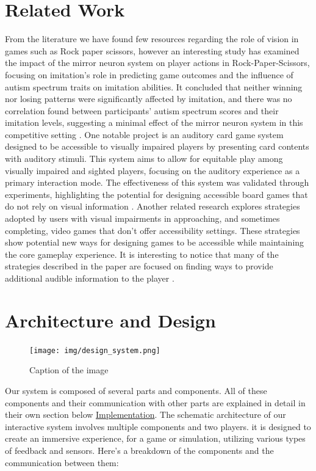 \documentclass[11pt,a4paper]{report}
\begin{document}
\section*{Related Work}

From the literature we have found few resources regarding the role of vision in games such as Rock paper scissors, however an interesting study has examined the impact of the mirror neuron system on player actions in Rock-Paper-Scissors, focusing on imitation's role in predicting game outcomes and the influence of autism spectrum traits on imitation abilities. It concluded that neither winning nor losing patterns were significantly affected by imitation, and there was no correlation found between participants' autism spectrum scores and their imitation levels, suggesting a minimal effect of the mirror neuron system in this competitive setting \cite*{4}.
One notable project is an auditory card game system designed to be accessible to visually impaired players by presenting card contents with auditory stimuli. This system aims to allow for equitable play among visually impaired and sighted players, focusing on the auditory experience as a primary interaction mode. The effectiveness of this system was validated through experiments, highlighting the potential for designing accessible board games that do not rely on visual information \cite*{3} .
Another related research explores strategies adopted by users with visual impairments in approaching, and sometimes completing, video games that don't offer accessibility settings. These strategies show potential new ways for designing games to be accessible while maintaining the core gameplay experience. It is interesting to notice that many of the strategies described in the paper are focused on finding ways to provide additional audible information to the player \cite*{5}.

\section*{Architecture and Design}
\begin{figure}[htbp]
  \centering
  \texttt{[image: img/design\_system.png]}
  \caption{Caption of the image}
  \label{fig:image_label}
\end{figure}

\noindent Our system is composed of several parts and components.
All of these components and their communication with other parts are explained in detail in their own section below \hyperref[sec:Implementation]{Implementation}.
The schematic architecture of our interactive system involves multiple components and two players. it is designed to create an immersive experience, for a game or simulation, utilizing various types of feedback and sensors. Here's a breakdown of the components and the communication between them:
\end{document}
